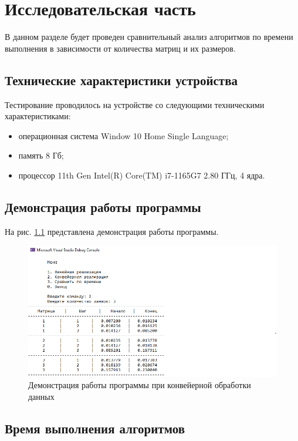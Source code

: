 \chapter{Исследовательская часть}

В данном разделе будет проведен сравнительный анализ алгоритмов по времени выполнения в зависимости от количества матриц и их размеров.

\section{Технические характеристики устройства}

Тестирование проводилось на устройстве со следующими техническими характеристиками:

\begin{itemize}[label=---]
	\item операционная система Window 10 Home Single Language;
	\item память 8 Гб;
	\item процессор 11th Gen Intel(R) Core(TM) i7-1165G7 2.80 ГГц, 4 ядра.
\end{itemize}

\section{Демонстрация работы программы}

На рис. \ref{fig:test_parallel} представлена демонстрация работы программы.

\begin{figure}[h]
	\centering
	\includegraphics[scale=0.9]{img/exp2.png}
	\caption{Демонстрация работы программы при конвейерной обработки данных}
	\label{fig:test_parallel}
\end{figure} 

\section{Время выполнения алгоритмов}

